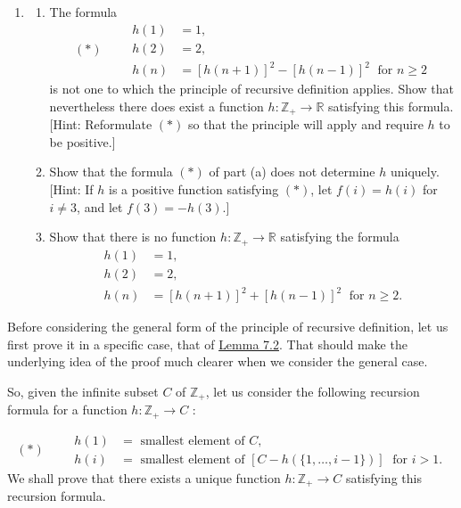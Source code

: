 \begin{enumerate}[itemsep=0.4em, parsep=0pt, topsep=0pt, partopsep=0pt, leftmargin=*, label=\arabic*., ref=\arabic*]
\item
  \begin{enumerate}[itemsep=0.2em, parsep=0pt, topsep=0pt, partopsep=0pt, leftmargin=*, label=(\alph*), align=left]
  \item The formula \[ (*) \qquad \begin{aligned} h(1) &= 1, \\ h(2) &= 2\text{, } \\ h(n) &= {[ h( n + 1) ] }^{2} - {[ h( n - 1) ] }^{2}\;\text{ for }n \geq 2 \end{aligned} \] is not one to which the principle of recursive definition applies. Show that nevertheless there does exist a function \(h : \mathbb{Z}_{+} \rightarrow \mathbb{R}\) satisfying this formula. [Hint: Reformulate \((*)\) so that the principle will apply and require \(h\) to be positive.]
  \item Show that the formula \((*)\) of part (a) does not determine \(h\) uniquely. [Hint: If \(h\) is a positive function satisfying \((*)\), let \(f(i) = h(i)\) for \(i \neq 3\), and let \(f( 3) = - h( 3)\).]
  \item Show that there is no function \(h : \mathbb{Z}_{+} \rightarrow \mathbb{R}\) satisfying the formula \[ \begin{aligned} h(1) &= 1, \\ h(2) &= 2, \\ h(n) &= {[ h( n + 1) ] }^{2} + {[ h( n - 1) ] }^{2}\;\text{ for }n \geq 2. \end{aligned} \]
  \end{enumerate}
\end{enumerate}


Before considering the general form of the principle of recursive definition, 
let us first prove it in a specific case, that of \hyperref[lem:7.2]{Lemma 7.2}. That should make 
the underlying idea of the proof much clearer when we consider the general case.

So, given the infinite subset \(C\) of \(\mathbb{Z}_{+}\), let us consider 
the following recursion formula for a function \(h : \mathbb{Z}_{+} \rightarrow C\) :

\[
(*) \qquad
\begin{aligned}
h(1) &= \text{ smallest element of }C\text{, } \\
h(i) &= \text{ smallest element of }[{C - h({\{1,\ldots, i - 1\} }) }] \;\text{ for }i > 1\text{.}
\end{aligned}
\]
We shall prove that there exists a unique function \(h : \mathbb{Z}_{+} \rightarrow C\) 
satisfying this recursion formula.

